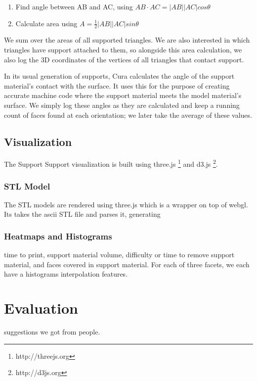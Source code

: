 \documentclass{sigchi}
\begin{document}
\begin{enumerate}
\item Find angle between AB and AC, using $AB \cdot AC = |AB||AC|cos\theta$
\item Calculate area using $A = \frac{1}{2}|AB||AC|sin\theta$
\end{enumerate}

We sum over the areas of all supported triangles.  We are also interested in which triangles have support attached to them, so alongside this area calculation, we also log the 3D coordinates of the vertices of all triangles that contact support.

In its usual generation of supports, Cura calculates the angle of the support material's contact with the surface.  It uses this for the purpose of creating accurate machine code where the support material meets the model material's surface.  We simply log these angles as they are calculated and keep a running count of faces found at each orientation; we later take the average of these values.

\subsection{Visualization}

The Support Support visualization is built using three.js \footnote{http://threejs.org} and d3.js \footnote{http://d3js.org}.

\subsubsection{STL Model}
The STL models are rendered using three.js which is a wrapper on top of webgl. Its takes the ascii STL file and parses it, generating 

\subsubsection{Heatmaps and Histograms}
time to print, support material volume, difficulty or time to remove support material, and faces covered in support material.
For each of three facets, we each have a histograms
interpolation features.


\section{Evaluation}
suggestions we got from people.
\end{document}
